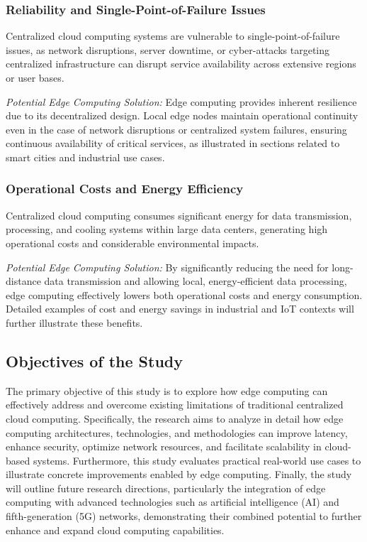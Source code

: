 \documentclass[runningheads]{llncs}
\begin{document}
\subsubsection{Reliability and Single-Point-of-Failure Issues}
Centralized cloud computing systems are vulnerable to single-point-of-failure issues, as network disruptions, server downtime, or cyber-attacks targeting centralized infrastructure can disrupt service availability across extensive regions or user bases.

\textit{Potential Edge Computing Solution:} Edge computing provides inherent resilience due to its decentralized design. Local edge nodes maintain operational continuity even in the case of network disruptions or centralized system failures, ensuring continuous availability of critical services, as illustrated in sections related to smart cities and industrial use cases.

\subsubsection{Operational Costs and Energy Efficiency}
Centralized cloud computing consumes significant energy for data transmission, processing, and cooling systems within large data centers, generating high operational costs and considerable environmental impacts.

\textit{Potential Edge Computing Solution:} By significantly reducing the need for long-distance data transmission and allowing local, energy-efficient data processing, edge computing effectively lowers both operational costs and energy consumption. Detailed examples of cost and energy savings in industrial and IoT contexts will further illustrate these benefits.

\subsection{Objectives of the Study}

The primary objective of this study is to explore how edge computing can effectively address and overcome existing limitations of traditional centralized cloud computing. Specifically, the research aims to analyze in detail how edge computing architectures, technologies, and methodologies can improve latency, enhance security, optimize network resources, and facilitate scalability in cloud-based systems. Furthermore, this study evaluates practical real-world use cases to illustrate concrete improvements enabled by edge computing. Finally, the study will outline future research directions, particularly the integration of edge computing with advanced technologies such as artificial intelligence (AI) and fifth-generation (5G) networks, demonstrating their combined potential to further enhance and expand cloud computing capabilities.
\end{document}
